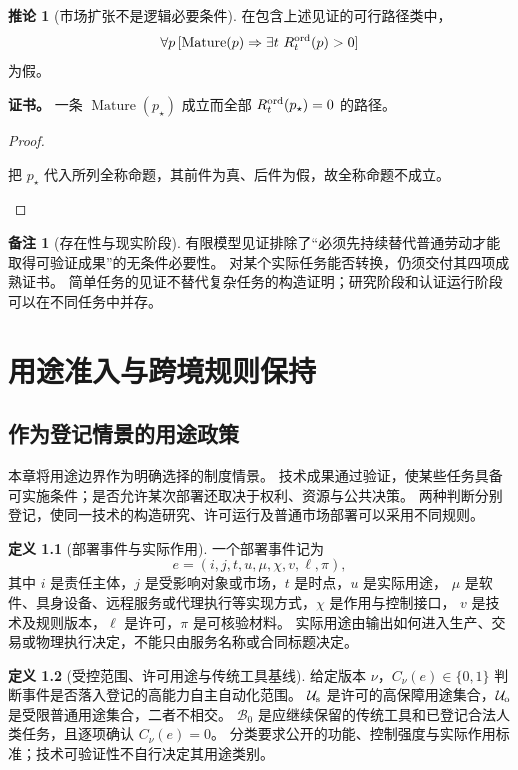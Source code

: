 \documentclass[UTF8,12pt,a4paper,openany,fontset=none,zihao=false]{ctexrep}
\theoremstyle{definition}
\newtheorem{definition}{定义}[chapter]
\newtheorem{corollary}{推论}[chapter]
\newtheorem{remark}{备注}[chapter]
\newenvironment{certificate}{\par\noindent\textbf{证书。}\ignorespaces}{\par}
\newcommand{\1}{\mathbf 1}
\begin{document}
\begin{corollary}[市场扩张不是逻辑必要条件]
\label{tra:not-necessary}
在包含上述见证的可行路径类中，
\[
\forall p\,[\operatorname{Mature}(p)\Rightarrow
\exists t\ R_t^{\rm ord}(p)>0]
\]
为假。
\end{corollary}
\begin{certificate}
一条 \(\operatorname{Mature}(p_\star)\) 成立而全部 \(R_t^{\rm ord}(p_\star)=0\) 的路径。
\end{certificate}
\begin{proof}
\begin{semanticsteps}
\item 把 \(p_\star\) 代入所列全称命题，其前件为真、后件为假，故全称命题不成立。
\end{semanticsteps}
\end{proof}

\begin{remark}[存在性与现实阶段]
有限模型见证排除了“必须先持续替代普通劳动才能取得可验证成果”的无条件必要性。
对某个实际任务能否转换，仍须交付其四项成熟证书。
简单任务的见证不替代复杂任务的构造证明；研究阶段和认证运行阶段可以在不同任务中并存。
\end{remark}

\chapter{用途准入与跨境规则保持}
\label{gov:chapter}

\section{作为登记情景的用途政策}

本章将用途边界作为明确选择的制度情景。
技术成果通过验证，使某些任务具备可实施条件；是否允许某次部署还取决于权利、资源与公共决策。
两种判断分别登记，使同一技术的构造研究、许可运行及普通市场部署可以采用不同规则。

\begin{definition}[部署事件与实际作用]
\label{gov:event}
一个部署事件记为
\[
e=(i,j,t,u,\mu,\chi,v,\ell,\pi),
\]
其中 \(i\) 是责任主体，\(j\) 是受影响对象或市场，\(t\) 是时点，\(u\) 是实际用途，
\(\mu\) 是软件、具身设备、远程服务或代理执行等实现方式，\(\chi\) 是作用与控制接口，
\(v\) 是技术及规则版本，\(\ell\) 是许可，\(\pi\) 是可核验材料。
实际用途由输出如何进入生产、交易或物理执行决定，不能只由服务名称或合同标题决定。
\end{definition}

\begin{definition}[受控范围、许可用途与传统工具基线]
\label{gov:scope}
给定版本 \(\nu\)，\(C_\nu(e)\in\{0,1\}\) 判断事件是否落入登记的高能力自主自动化范围。
\(\mathcal U_{\rm s}\) 是许可的高保障用途集合，\(\mathcal U_{\rm o}\) 是受限普通用途集合，二者不相交。
\(\mathcal B_0\) 是应继续保留的传统工具和已登记合法人类任务，且逐项确认 \(C_\nu(e)=0\)。
分类要求公开的功能、控制强度与实际作用标准；技术可验证性不自行决定其用途类别。
\end{definition}
\end{document}
